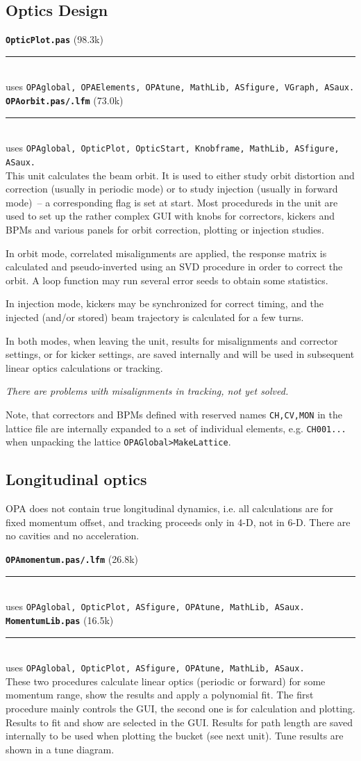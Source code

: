 \documentclass[12pt]{article}
\newcommand\code[1]{{\tt #1}}
\newcommand{\todo}[1]{{\color{red}\em #1}}
\newcommand\opamodule[3]{{\bf \tt #1} #2\\  \rule[3pt]{\textwidth}{0.2pt} \\ {\scriptsize uses \tt  #3}\\[1ex]}
\begin{document}
\subsection{Optics Design}


\opamodule{OpticPlot.pas}{(98.3k)}{OPAglobal, OPAElements, OPAtune, MathLib, ASfigure, VGraph, ASaux.}

\opamodule{OPAorbit.pas/.lfm}{(73.0k)}{OPAglobal, OpticPlot,  OpticStart, Knobframe, MathLib, ASfigure, ASaux.}
This unit calculates the beam orbit. It is used to either study orbit distortion and correction (usually in periodic mode) or to study injection (usually in forward mode)~-- a corresponding flag is set at start. Most procedureds in the unit are used to set up the rather complex GUI with knobs for correctors, kickers and BPMs and various panels for orbit correction, plotting or injection studies.

In orbit mode, correlated misalignments are applied, the response matrix is calculated and pseudo-inverted using an SVD procedure in order to correct the orbit. A loop function may run several error seeds to obtain some statistics.

In injection mode, kickers may be synchronized for correct timing, and the injected (and/or stored) beam trajectory is calculated for a few turns.

In both modes, when leaving the unit, results for misalignments and corrector settings, or for kicker settings, are saved internally and will be used in subsequent linear optics calculations or tracking.

\todo{There are problems with misalignments in tracking, not yet solved.}

Note, that correctors and BPMs defined with reserved names {\tt CH,CV,MON} in the lattice file are internally expanded to a set of individual elements, e.g. {\tt CH001...} when unpacking the lattice \code{OPAGlobal>MakeLattice}.

\subsection{Longitudinal optics}
OPA does not contain true longitudinal dynamics, i.e. all calculations are for fixed momentum offset, and tracking proceeds only in 4-D, not in 6-D. There are no cavities and no acceleration.

\opamodule{OPAmomentum.pas/.lfm}{(26.8k)}{OPAglobal, OpticPlot, ASfigure, OPAtune, MathLib, ASaux.}
\opamodule{MomentumLib.pas}{(16.5k)}{OPAglobal, OpticPlot, ASfigure, OPAtune, MathLib, ASaux.}
These two procedures calculate linear optics (periodic or forward) for some momentum range, show the results and apply a polynomial fit. The first procedure mainly controls the GUI, the second one is for calculation and plotting.
Results to fit and show are selected in the GUI. Results for path length are saved internally to be used when plotting the bucket (see next unit). Tune results are shown in a tune diagram.
\end{document}
